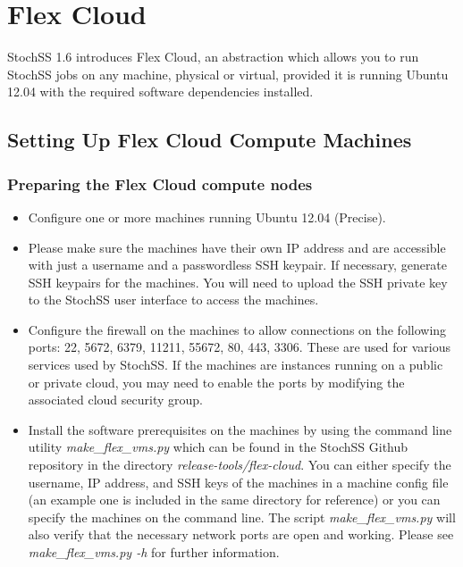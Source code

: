 

\chapter{Flex Cloud}


StochSS 1.6 introduces Flex Cloud, an abstraction which allows you to run StochSS jobs on any machine, physical or virtual, provided it is running Ubuntu 12.04 with the required software dependencies installed. %

\section{Setting Up Flex Cloud Compute Machines}

\subsection{Preparing the Flex Cloud compute nodes}
\begin{itemize}
\item Configure one or more machines running Ubuntu 12.04 (Precise). %
\item Please make sure the machines have their own IP address and are accessible with just a username and a passwordless SSH keypair. If necessary, generate SSH keypairs for the machines. You will need to upload the SSH private key to the StochSS user interface to access the machines.
\item Configure the firewall on the machines to allow connections on the following ports: 22, 5672, 6379, 11211, 55672, 80, 443, 3306. These are used for various services used by StochSS. If the machines are instances running on a public or private cloud, you may need to enable the ports by modifying the associated cloud security group. 
\item Install the software prerequisites on the machines by using the command line utility \emph{make\_flex\_vms.py}  which can be found in the StochSS Github repository in the directory \emph{release-tools/flex-cloud}. You can either specify the username, IP address, and SSH keys of the machines in a machine config file (an example one is included in the same directory for reference) or you can specify the machines on the command line. The script \emph{make\_flex\_vms.py} will also verify that the necessary network ports are open and working. Please see \emph{make\_flex\_vms.py -h} for further information.
\end{itemize}

